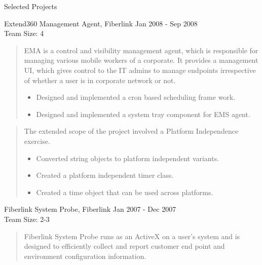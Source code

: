 \documentclass{resume}
\newcommand{\teamsize}{\\\sc\footnotesize Team Size: }
\begin{document}
\begin{category}{Selected Projects}{}

    \item {\topic Extend360 Management Agent,} Fiberlink
        {\period Jan 2008 - Sep 2008}
	{\teamsize 4}
        \begin{quote}
            EMA is a control and visibility management agent, which is
            responsible for managing various mobile workers of a corporate. It
            provides a management UI, which gives control to the IT admins to
            manage endpoints irrespective of  whether a user is in corporate
            network or not.

            \begin{itemize}
                \item Designed and implemented a cron based scheduling frame work.
                \item Designed and implemented a system tray component for EMS agent.
            \end{itemize}
        \end{quote}
        \begin{quote}
            The extended scope of the project involved a Platform Independence
            exercise.

            \begin{itemize}
                \item Converted string objects to platform independent
                    variants.
                \item Created a platform independent timer class.
                \item Created a time object that can be used across platforms.
            \end{itemize}
        \end{quote}

    \item {\topic Fiberlink System Probe,} Fiberlink
        {\period Jan 2007 - Dec 2007}
	{\teamsize 2-3}
        \begin{quote}
            Fiberlink System Probe runs as an ActiveX on a user’s system and is
            designed to efficiently collect and report customer end point and
            environment configuration information.


\end{quote}
\end{category}
\end{document}
